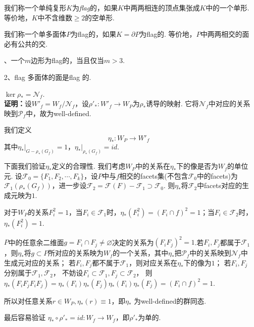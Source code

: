 \documentclass{article}
\theoremstyle{plain}%
\theoremstyle{definition}
\theoremstyle{remark}
\begin{document}
{{
我们称一个单纯复形$K$为{\em flag}的，如果$K$中两两相连的顶点集张成$K$中的一个单形. 等价地，$K$中不含维数$\geq 2$的空单形.

我们称一个单多面体$P$为flag的，如果$K=\partial P$为flag的. 等价地，$P$中两两相交的面必有公共的交.}

{、一个$m$边形为flag的，当且仅当$m>3$.

2、flag 多面体的面是flag 的.
}





{\lem \label{W-mon} $\ker \rho_*=\mathcal{N}_f$.}\\
{\bf 证明：}设$W'_f=W_f/\mathcal{N}_f$，设$\rho'_*:W'_f\longrightarrow W_P$为$\rho_*$诱导的映射. 它将$\mathcal{N}_f$中对应的关系映到$\mathcal{P}_f$中，故为well-defined.

我们定义
\begin{equation}\label{eq7}
\eta_{*}:W_P\longrightarrow W'_f
\end{equation}
其中$\eta_{*}|_{G-\rho_*(G_f)}=1$，$\eta_{*}|_{\rho_*(G_f)}=id$.

下面我们验证$\eta_{*}$定义的合理性. 我们考虑$W_P$中的关系在$\eta_{*}$下的像是否为$W_f$的单位元. 
设$\mathcal{F}_0=\{F_1,F_2,\cdots,F_k\}$，设$P$中与$f$相交的facets集(不包含$\mathcal{F}_0$中的facets)为$\mathcal{F}_1(\rho_*(G_f))$，进一步设$\mathcal{F}_2=\mathcal{F}(F)-\mathcal{F}_1\supset \mathcal{F}_0$.  
则$\eta_{*}$将$\mathcal{F}_2$中facets对应的生成元映为$1$.

对于$W_P$的关系$F_i^2=1$，当$F_i\in \mathcal{F}_1$时，$\eta_{*}(F_i^2)=(F_i\cap f)^2=1$；当$F_i\in \mathcal{F}_2$时，$\eta_{*}(F_i^2)=1$. 

$P$中的任意余二维面$g=F_{i}\cap F_{j}\neq\varnothing$决定的关系为$(F_iF_j)^2=1$.若$F_{i},F_{j}$都属于$\mathcal{F}_1$，则$\eta_{*}$将$g\subset P$所对应的关系映为$W_f$的一个关系，其中$\eta_{*}$把$\mathcal{P}_f$中的关系映到$\mathcal{N}_f$中生成元对应的关系；
若$F_{i},F_{j}$都不属于$\mathcal{F}_1$，则对应关系在$\eta_{*}$下的像为$1$；
若$F_{i},F_{j}$分别属于$\mathcal{F}_1,\mathcal{F}_2$，
不妨设$F_{i}\subset \mathcal{F}_1,F_{j}\subset \mathcal{F}_2$，
则$\eta_{*}(F_iF_jF_iF_j)=\eta_{*}(F_i)\eta_{*}(F_j)\eta_{*}(F_i)\eta_{*}(F_j)=(F_i\cap f)^2=1$. 

所以对任意关系$r\in W_P,\eta_{*}(r)\equiv 1$，即$\eta_{*}$ 为well-defined的群同态.

最后容易验证
$\eta_{*}\circ\rho'_{*}=id:W_f\longrightarrow W_f$，即$\rho'_{*}$为单的.  

}
\end{document}
